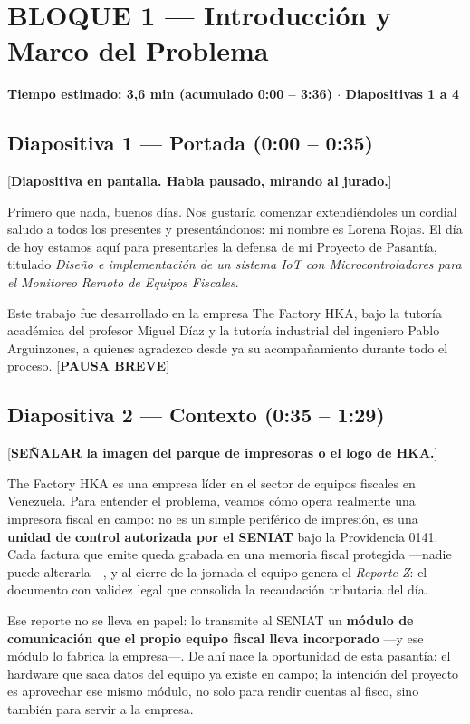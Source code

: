 \documentclass[11pt, a4paper]{article}
\begin{document}
\newpage

\section*{BLOQUE 1 — Introducción y Marco del Problema}
\textbf{Tiempo estimado: 3,6 min (acumulado 0:00 – 3:36) $\cdot$ Diapositivas 1 a 4}

\subsection*{Diapositiva 1 — Portada (0:00 – 0:35)}

[\textbf{Diapositiva en pantalla. Habla pausado, mirando al jurado.}]

Primero que nada, buenos días. Nos gustaría comenzar extendiéndoles un cordial saludo a todos los presentes y presentándonos: mi nombre es Lorena Rojas. El día de hoy estamos aquí para presentarles la defensa de mi Proyecto de Pasantía, titulado \textit{Diseño e implementación de un sistema IoT con Microcontroladores para el Monitoreo Remoto de Equipos Fiscales}.

Este trabajo fue desarrollado en la empresa The Factory HKA, bajo la tutoría académica del profesor Miguel Díaz y la tutoría industrial del ingeniero Pablo Arguinzones, a quienes agradezco desde ya su acompañamiento durante todo el proceso. [\textbf{PAUSA BREVE}]

\subsection*{Diapositiva 2 — Contexto (0:35 – 1:29)}

[\textbf{SEÑALAR la imagen del parque de impresoras o el logo de HKA.}]

The Factory HKA es una empresa líder en el sector de equipos fiscales en Venezuela. Para entender el problema, veamos cómo opera realmente una impresora fiscal en campo: no es un simple periférico de impresión, es una \textbf{unidad de control autorizada por el SENIAT} bajo la Providencia 0141. Cada factura que emite queda grabada en una memoria fiscal protegida —nadie puede alterarla—, y al cierre de la jornada el equipo genera el \textit{Reporte Z}: el documento con validez legal que consolida la recaudación tributaria del día.

Ese reporte no se lleva en papel: lo transmite al SENIAT un \textbf{módulo de comunicación que el propio equipo fiscal lleva incorporado} —y ese módulo lo fabrica la empresa—. De ahí nace la oportunidad de esta pasantía: el hardware que saca datos del equipo ya existe en campo; la intención del proyecto es aprovechar ese mismo módulo, no solo para rendir cuentas al fisco, sino también para servir a la empresa.
\end{document}
